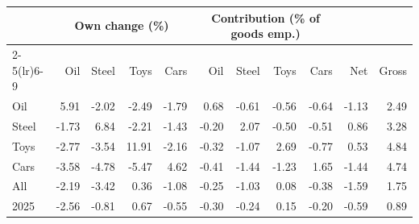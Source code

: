 \begin{tabular}{lrrrrrrrrrr}
\toprule
 & \multicolumn{4}{c}{Own change (\%)} & \multicolumn{4}{c}{Contribution (\% of goods emp.)} & & \\
\cmidrule(lr){2-5}\cmidrule(lr){6-9}
 & Oil & Steel & Toys & Cars & Oil & Steel & Toys & Cars & Net & Gross \\
\midrule
Oil & 5.91 & -2.02 & -2.49 & -1.79 & 0.68 & -0.61 & -0.56 & -0.64 & -1.13 & 2.49 \\
Steel & -1.73 & 6.84 & -2.21 & -1.43 & -0.20 & 2.07 & -0.50 & -0.51 & 0.86 & 3.28 \\
Toys & -2.77 & -3.54 & 11.91 & -2.16 & -0.32 & -1.07 & 2.69 & -0.77 & 0.53 & 4.84 \\
Cars & -3.58 & -4.78 & -5.47 & 4.62 & -0.41 & -1.44 & -1.23 & 1.65 & -1.44 & 4.74 \\
All & -2.19 & -3.42 & 0.36 & -1.08 & -0.25 & -1.03 & 0.08 & -0.38 & -1.59 & 1.75 \\
2025 & -2.56 & -0.81 & 0.67 & -0.55 & -0.30 & -0.24 & 0.15 & -0.20 & -0.59 & 0.89 \\
\bottomrule
\end{tabular}
